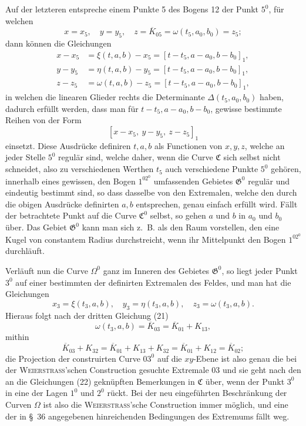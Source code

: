 \documentclass[11pt,a4paper,leqno]{article}
\begin{document}
Auf der letzteren entspreche einem Punkte 5 des Bogens 12 der Punkt $5^0$, für welchen
\[
x=x_5,\quad y=y_5,\quad z=\overline{K}_{05}=\omega(t_5,a_0,b_0)=z_5;
\]
dann können die Gleichungen
\begin{equation}\tag{22}
\begin{aligned}
x-x_5&=\xi(t,a,b)-x_5=[t-t_5,a-a_0,b-b_0]_1,\\
y-y_5&=\eta(t,a,b)-y_5=[t-t_5,a-a_0,b-b_0]_1,\\
z-z_5&=\omega(t,a,b)-z_5=[t-t_5,a-a_0,b-b_0]_1,
\end{aligned}
\end{equation}
in welchen die linearen Glieder rechts die Determinante $\Delta(t_5,a_0,b_0)$ haben, dadurch erfüllt werden, dass man für $t-t_5,a-a_0,b-b_0$, gewisse bestimmte Reihen von der Form
\[
[x-x_5,\ y-y_5,\ z-z_5]_1
\]
einsetzt. Diese Ausdrücke definiren $t,a,b$ als Functionen von $x,y,z$, welche an jeder Stelle $5^0$ regulär sind, welche daher, wenn die Curve $\mathfrak{C}$ sich selbst nicht schneidet, also zu verschiedenen Werthen $t_5$ auch verschiedene Punkte $5^0$ gehören, innerhalb eines gewissen, den Bogen $1^02^0$ umfassenden Gebietes $\mathfrak{G}^0$ regulär und eindeutig bestimmt sind, so dass dasselbe von den Extremalen, welche den durch die obigen Ausdrücke definirten $a,b$ entsprechen, genau einfach erfüllt wird. Fällt der betrachtete Punkt auf die Curve $\mathfrak{C}^0$ selbst, so gehen $a$ und $b$ in $a_0$ und $b_0$ über. Das Gebiet $\mathfrak{G}^0$ kann man sich z.~B. als den Raum vorstellen, den eine Kugel von constantem Radius durchstreicht, wenn ihr Mittelpunkt den Bogen $1^02^0$ durchläuft.

Verläuft nun die Curve $\Omega^0$ ganz im Inneren des Gebietes $\mathfrak{G}^0$, so liegt jeder Punkt $3^0$ auf einer bestimmten der definirten Extremalen des Feldes, und man hat die Gleichungen
\[
x_3=\xi(t_3,a,b),\quad y_3=\eta(t_3,a,b),\quad z_3=\omega(t_3,a,b).
\]
Hieraus folgt nach der dritten Gleichung (21)
\[
\omega(t_3,a,b)=\overline{K}_{03}=\overline{K}_{01}+K_{13},
\]
mithin
\[
\overline{K}_{03}+K_{32}=\overline{K}_{01}+K_{13}+K_{32}=\overline{K}_{01}+K_{12}=\overline{K}_{02};
\]
die Projection der construirten Curve $03^0$ auf die $xy$-Ebene ist also genau die bei der \textsc{Weierstrass}'schen Construction gesuchte Extremale 03 und sie geht nach den an die Gleichungen (22) geknüpften Bemerkungen in $\mathfrak{C}$ über, wenn der Punkt $3^0$ in eine der Lagen $1^0$ und $2^0$ rückt. Bei der neu eingeführten Beschränkung der Curven $\Omega$ ist also die \textsc{Weierstrass}'sche Construction immer möglich, und eine der in \S~36 angegebenen hinreichenden Bedingungen des Extremums fällt weg.
\end{document}

